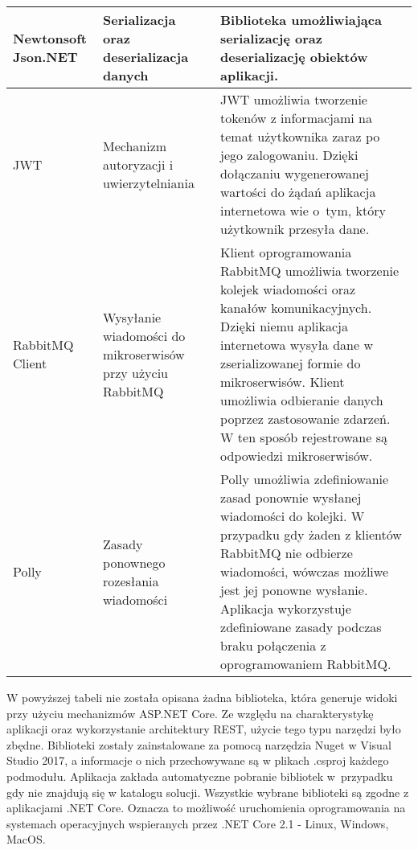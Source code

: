 \begin{center}
\begin{longtable}{ | p{3.1cm} | p{4cm} | p{6.5cm} |}
    \hline Newtonsoft Json.NET  
    & Serializacja oraz deserializacja danych
    & Biblioteka umożliwiająca serializację oraz deserializację obiektów aplikacji.\\ \hline
    
    \hline JWT
     & Mechanizm autoryzacji i uwierzytelniania
    & JWT umożliwia tworzenie tokenów z informacjami na temat użytkownika zaraz po jego zalogowaniu. Dzięki dołączaniu wygenerowanej wartości do żądań aplikacja internetowa wie o~tym, który użytkownik przesyła dane.\\ \hline
    
     \hline RabbitMQ Client
    & Wysyłanie \newline wiadomości do \newline mikroserwisów przy użyciu RabbitMQ
    & Klient oprogramowania RabbitMQ umożliwia tworzenie kolejek wiadomości oraz kanałów komunikacyjnych. Dzięki niemu aplikacja internetowa wysyła dane w zserializowanej formie do mikroserwisów. Klient umożliwia odbieranie danych poprzez zastosowanie zdarzeń. W ten sposób rejestrowane są odpowiedzi mikroserwisów.\\ \hline
    
     \hline Polly
    & Zasady ponownego rozesłania wiadomości
    & Polly umożliwia zdefiniowanie zasad ponownie wysłanej wiadomości do kolejki. W przypadku gdy żaden z klientów RabbitMQ nie odbierze wiadomości, wówczas możliwe jest jej ponowne wysłanie. Aplikacja wykorzystuje zdefiniowane zasady podczas braku połączenia z oprogramowaniem RabbitMQ.\\ \hline
    
	\end{longtable}
\end{center}

W powyższej tabeli nie została opisana żadna biblioteka, która generuje widoki przy użyciu mechanizmów ASP.NET Core. Ze względu na charakterystykę aplikacji oraz wykorzystanie architektury REST, użycie tego typu narzędzi było zbędne. Biblioteki zostały zainstalowane za pomocą narzędzia Nuget w Visual Studio 2017, a informacje o nich przechowywane są w plikach .csproj każdego podmodułu. Aplikacja zakłada automatyczne pobranie bibliotek w~przypadku gdy nie znajdują się w katalogu solucji. Wszystkie wybrane biblioteki są zgodne z aplikacjami .NET Core. Oznacza to możliwość uruchomienia oprogramowania na systemach operacyjnych wspieranych przez .NET Core 2.1 - Linux, Windows, MacOS.

